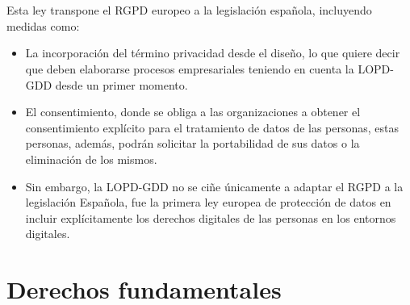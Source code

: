 \begin{refsection}
\\ \\
Esta ley transpone el RGPD europeo a la legislación española, incluyendo medidas como:
\begin{itemize}
  \item La incorporación del término privacidad desde el diseño, lo que quiere decir que deben elaborarse procesos empresariales teniendo en cuenta la LOPD-GDD desde un primer momento. 
  \item El consentimiento, donde se obliga a las organizaciones a obtener el consentimiento explícito para el tratamiento de datos de las personas, estas personas, además, podrán solicitar la portabilidad de sus datos o la eliminación de los mismos.
  \item Sin embargo, la LOPD-GDD no se ciñe únicamente a adaptar el RGPD a la legislación Española, fue la primera ley europea de protección de datos en incluir explícitamente los derechos digitales de las personas en los entornos digitales.
\end{itemize}

\section{Derechos fundamentales}\label{appendix:ProteccionDatos_Derechos}


\end{refsection}
